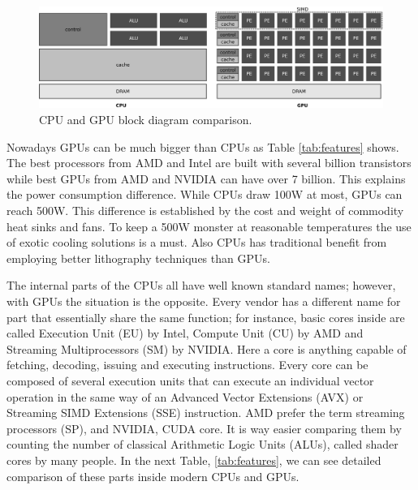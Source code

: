 \documentclass{article}
\begin{document}
\begin{figure}[!ht]
\centering
\includegraphics[width=\textwidth]{cpu-gpu.eps}
\caption{CPU and GPU block diagram comparison.}
\label{fig:cpu-gpu}
\end{figure}

Nowadays GPUs can be much bigger than CPUs as Table \ref{tab:features}
shows. The best processors from AMD and Intel are built with several
billion transistors while best GPUs from AMD and NVIDIA can have over
7 billion. This explains the power consumption difference. While CPUs
draw 100W at most, GPUs can reach 500W. This difference is established
by the cost and weight of commodity heat sinks and fans. To keep a
500W monster at reasonable temperatures the use of exotic cooling
solutions is a must. Also CPUs has traditional benefit from employing
better lithography techniques than GPUs.  %

The internal parts of the CPUs all have well known standard names;
however, with GPUs the situation is the opposite. Every vendor has a
different name for part that essentially share the same function; for
instance, basic cores %
inside are called Execution Unit (EU) by Intel, Compute Unit (CU) by
AMD and Streaming Multiprocessors (SM) by NVIDIA. Here a core is
anything capable of fetching, decoding, issuing and executing
instructions. Every core can be composed of several execution units
that can execute an individual vector operation in the same way of an
Advanced Vector Extensions (AVX) or Streaming SIMD Extensions (SSE)
instruction. AMD prefer the term streaming processors (SP), and
NVIDIA, CUDA core. It is way easier comparing them by counting the
number of classical Arithmetic Logic Units (ALUs), called shader cores
by many people. In the next Table, \ref{tab:features}, we can see
detailed comparison of these parts inside modern CPUs and GPUs. 
\end{document}
